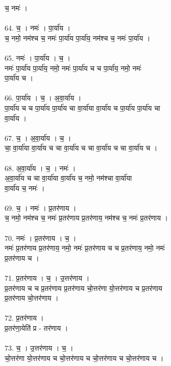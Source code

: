 च॒ नमः॑ ।\\
\\
64. च॒ । नमः॑ । पा॒र्या॑य ।\\
च॒ नमो॒ नम॑श्च च॒ नमः॑ पा॒र्या॑य पा॒र्या॑य॒ नम॑श्च च॒ नमः॑ पा॒र्या॑य ।\\
\\
65. नमः॑ । पा॒र्या॑य । च॒ ।\\
नमः॑ पा॒र्या॑य पा॒र्या॑य॒ नमो॒ नमः॑ पा॒र्या॑य च च पा॒र्या॑य॒ नमो॒ नमः॑\\
पा॒र्या॑य च ।\\
\\
66. पा॒र्या॑य । च॒ । अ॒वा॒र्या॑य ।\\
पा॒र्या॑य च च पा॒र्या॑य पा॒र्या॑य चा वा॒र्या॑या वा॒र्या॑य च पा॒र्या॑य पा॒र्या॑य चा\\
वा॒र्या॑य ।\\
\\
67. च॒ । अ॒वा॒र्या॑य । च॒ ।\\
चा॒ वा॒र्या॑या वा॒र्या॑य च चा वा॒र्या॑य च चा वा॒र्या॑य च चा वा॒र्या॑य च ।\\
\\
68. अ॒वा॒र्या॑य । च॒ । नमः॑ ।\\
अ॒वा॒र्या॑य च चा वा॒र्या॑या वा॒र्या॑य च॒ नमो॒ नम॑श्चा वा॒र्या॑या\\
वा॒र्या॑य च॒ नमः॑ ।\\
\\
69. च॒ । नमः॑ । प्र॒तर॑णाय ।\\
च॒ नमो॒ नम॑श्च च॒ नमः॑ प्र॒तर॑णाय प्र॒तर॑णाय॒ नम॑श्च च॒ नमः॑ प्र॒तर॑णाय ।\\
\\
70. नमः॑ । प्र॒तर॑णाय । च॒ ।\\
नमः॑ प्र॒तर॑णाय प्र॒तर॑णाय॒ नमो॒ नमः॑ प्र॒तर॑णाय च च प्र॒तर॑णाय॒ नमो॒ नमः॑\\
प्र॒तर॑णाय च ।\\
\\
71. प्र॒तर॑णाय । च॒ । उ॒त्तर॑णाय ।\\
प्र॒तर॑णाय च च प्र॒तर॑णाय प्र॒तर॑णाय चो॒त्तर॑णा यो॒त्तर॑णाय च प्र॒तर॑णाय\\
प्र॒तर॑णाय चो॒त्तर॑णाय ।\\
\\
72. प्र॒तर॑णाय ।\\
प्र॒तर॑णा॒येति॑ प्र - तर॑णाय ।\\
\\
73. च॒ । उ॒त्तर॑णाय । च॒ ।\\
चो॒त्तर॑णा यो॒त्तर॑णाय च चो॒त्तर॑णाय च चो॒त्तर॑णाय च चो॒त्तर॑णाय च ।\\
\\
